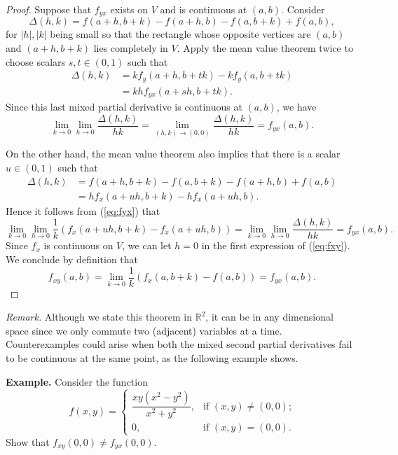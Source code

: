 \documentclass[11pt]{article}
\begin{document}
\begin{proof}
  Suppose that $f_{yx}$ exists on $V$ and is continuous at $(a,b)$.
  Consider
  \[
    \Delta(h,k) = f(a+h, b+k) - f(a+h, b) - f(a, b+k) + f(a,b),
  \]
  for $|h|, |k|$ being small so that the rectangle whose opposite vertices are $(a,b)$ and $(a+h,b+k)$ lies completely in $V$.
  Apply the mean value theorem twice to choose scalars $s, t \in (0,1)$ such that
  \begin{align*}
    \Delta(h,k) &= k f_y(a+h,b+tk) - k f_y(a,b+tk) \\
    &= k h f_{yx}(a+sh, b+tk).
  \end{align*}
  Since this last mixed partial derivative is continuous at $(a,b)$, we have
  \begin{equation}
    \label{eq:fyx}
    \lim_{k \to 0} \lim_{h \to 0} \frac{ \Delta(h,k) }{hk} = \lim_{(h,k) \to (0,0)} \frac{ \Delta(h,k) }{ hk } = f_{yx}(a,b).
  \end{equation}

  On the other hand, the mean value theorem also implies that there is a scalar $u \in (0,1)$ such that
  \begin{align*}
    \Delta(h,k) &= f(a+h, b+k) - f(a, b+k) - f(a+h, b) + f(a,b) \\
    &= h f_x(a+uh, b+k) - h f_x(a+uh, b).
  \end{align*}
  Hence it follows from (\ref{eq:fyx}) that
  \begin{equation}
    \label{eq:fxy}
    \lim_{k \to 0} \lim_{h \to 0} \frac{1}{k} \left( f_x(a+uh, b+k) - f_x(a+uh,b) \right) 
    = \lim_{k \to 0} \lim_{h \to 0} \frac{\Delta(h,k)}{ hk } = f_{yx}(a,b).
  \end{equation}
  Since $f_x$ is continuous on $V$, we can let $h = 0$ in the first expression of (\ref{eq:fxy}).
  We conclude by definition that
  \[
    f_{xy}(a,b) = \lim_{k\to0} \frac{1}{k} \left( f_x(a,b+k) - f(a,b) \right) = f_{yx}(a,b).
  \]
\end{proof}

\noindent\textit{Remark.} Although we state this theorem in $\mathbb{R}^2$, it can be in any dimensional space since we only commute two (adjacent) variables at a time.
Counterexamples could arise when both the mixed second partial derivatives fail to be continuous at the same point, as the following example shows.

\noindent\textbf{Example.} Consider the function
\[
  f(x,y) = 
  \begin{cases}
    \dfrac{xy(x^2-y^2)}{x^2+y^2}, & \text{if $(x,y) \ne (0,0)$;} \\
    0,                            & \text{if $(x,y) =   (0,0)$.}
  \end{cases}
\]
Show that $f_{xy}(0,0) \ne f_{yx}(0,0)$.
\end{document}
